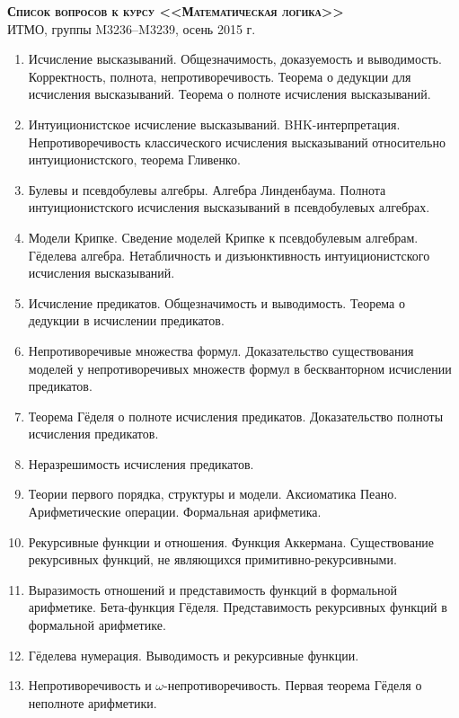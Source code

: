 \documentclass[12pt,a4paper,oneside]{scrartcl}
\begin{document}
\pagestyle{empty}

\begin{center}
{\large\scshape\bfseries Список вопросов к курсу <<Математическая логика>>}\\
ИТМО, группы M3236--M3239, осень 2015 г.
\end{center}

\vspace{0.5cm}

\begin{enumerate}
\item Исчисление высказываний. Общезначимость, доказуемость и выводимость. Корректность, полнота, непротиворечивость.
Теорема о дедукции для исчисления высказываний.
Теорема о полноте исчисления высказываний.
\item Интуиционистское исчисление высказываний. BHK-интерпретация. Непротиворечивость классического
исчисления высказываний относительно интуиционистского, теорема Гливенко.
\item Булевы и псевдобулевы алгебры. Алгебра Линденбаума. Полнота интуиционистского исчисления 
высказываний в псевдобулевых алгебрах.
\item Модели Крипке. Сведение моделей Крипке к псевдобулевым алгебрам. 
Гёделева алгебра. Нетабличность и дизъюнктивность интуиционистского исчисления высказываний.
\item Исчисление предикатов. Общезначимость и выводимость. Теорема о дедукции в исчислении предикатов.
\item Непротиворечивые множества формул. Доказательство существования моделей у непротиворечивых множеств формул 
в бескванторном исчислении предикатов.
\item Теорема Гёделя о полноте исчисления предикатов. Доказательство полноты исчисления предикатов.
\item Неразрешимость исчисления предикатов.
\item Теории первого порядка, структуры и модели. Аксиоматика Пеано. Арифметические операции. Формальная арифметика. 
\item Рекурсивные функции и отношения. Функция Аккермана. Существование рекурсивных функций,
не являющихся примитивно-рекурсивными. 
\item Выразимость отношений и представимость функций в формальной арифметике. Бета-функция Гёделя. 
Представимость рекурсивных функций в формальной арифметике.
\item Гёделева нумерация. Выводимость и рекурсивные функции.
\item Непротиворечивость и $\omega$-непротиворечивость. Первая теорема Гёделя о неполноте арифметики.

\end{enumerate}
\end{document}
